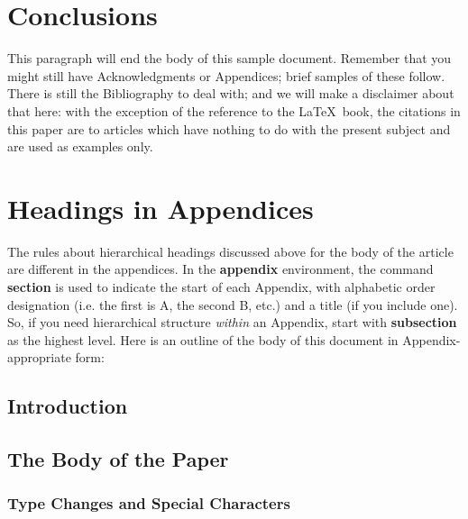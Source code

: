 \documentclass{sig-alternate}
\begin{document}
\section{Conclusions}
This paragraph will end the body of this sample document.
Remember that you might still have Acknowledgments or
Appendices; brief samples of these
follow.  There is still the Bibliography to deal with; and
we will make a disclaimer about that here: with the exception
of the reference to the \LaTeX\ book, the citations in
this paper are to articles which have nothing to
do with the present subject and are used as
examples only.

%

%
%
\appendix
\section{Headings in Appendices}
The rules about hierarchical headings discussed above for
the body of the article are different in the appendices.
In the \textbf{appendix} environment, the command
\textbf{section} is used to
indicate the start of each Appendix, with alphabetic order
designation (i.e. the first is A, the second B, etc.) and
a title (if you include one).  So, if you need
hierarchical structure
\textit{within} an Appendix, start with \textbf{subsection} as the
highest level. Here is an outline of the body of this
document in Appendix-appropriate form:
\subsection{Introduction}
\subsection{The Body of the Paper}
\subsubsection{Type Changes and  Special Characters}
\end{document}
